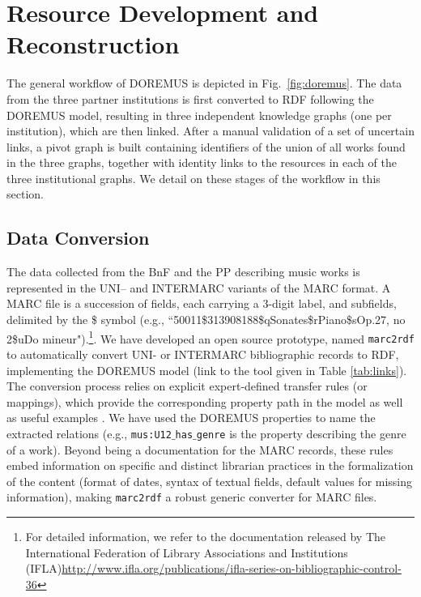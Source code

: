 \section{Resource Development and Reconstruction} \label{sec:develop}
The general workflow of DOREMUS is depicted in Fig.~\ref{fig:doremus}. The data from the three partner institutions is first converted to RDF following the DOREMUS model, resulting in three independent knowledge graphs (one per institution), which are then linked. After a manual validation of a set of uncertain links, a pivot graph is built containing identifiers of the union of all works found in the three graphs, together with identity links to the resources in each of the three institutional graphs. We detail on these stages of the workflow in this section. 


\subsection{Data Conversion}
The data collected from the BnF and the PP describing music works is represented in the UNI-- and INTERMARC variants of the MARC format. A MARC file is a succession of fields, each carrying a 3-digit label, and subfields, delimited by the \$ symbol (e.g., ``50011\$313908188\$qSonates\$rPiano\$sOp.27, no 2\$uDo   mineur").\footnote{For detailed information, we refer to the documentation released by The International Federation of Library Associations and Institutions (IFLA){\url{http://www.ifla.org/publications/ifla-series-on-bibliographic-control-36}}}. We have developed an open source prototype, named {\tt marc2rdf} to automatically convert UNI- or INTERMARC bibliographic records to RDF, implementing the DOREMUS model (link to the tool given in Table \ref{tab:links}). The conversion process relies on explicit expert-defined transfer rules (or mappings), which provide the corresponding property path in the model as well as useful examples \cite{lisena2016exploring}. We have used the DOREMUS properties to name the extracted relations (e.g., \texttt{mus:U12$\_$has$\_$genre} is the property describing the genre of a work). Beyond being a  documentation for the MARC records, these rules embed  information on specific and distinct librarian practices in the formalization of the content (format of dates, syntax of textual fields, default values for missing information), making \texttt{marc2rdf} a robust generic converter for MARC files.

